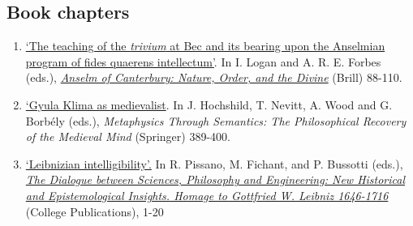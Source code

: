 \subsection{Book chapters}
\begin{enumerate}
	\setcounter{enumi}{\value{publicationCounter}}	%
	\item {}
{}
{
	\href{https://www.academia.edu/15012500/The_trivium_at_Bec_and_its_bearing_on_Anselms_programme_of_fides_quaerens_intellectum}{`The teaching of the \emph{trivium} at Bec and its bearing upon the Anselmian program of {fides quaerens intellectum}'}. In I. Logan and A. R. E. Forbes (eds.), \href{https://doi.org/10.1163/9789004716308_006}{\emph{Anselm of Canterbury: Nature, Order, and the Divine}} (Brill) 88-110.}
{}


\item \datedsubsectionnarrow{}
{}
{
	\href{https://link.springer.com/content/pdf/bbm:978-3-031-15026-5/1}{`Gyula Klima as medievalist}. In J. Hochshild, T. Nevitt, A. Wood and G. Borb\'{e}ly (eds.), \emph{Metaphysics Through Semantics: The Philosophical Recovery of the Medieval Mind} (Springer) 389-400.}
{}
\item {}
{}
{
	\href{https://www.academia.edu/14265939/Leibnizian_intelligibility}{`Leibnizian intelligibility'.} In R. Pissano, M. Fichant, and P. Bussotti (eds.), \href{http://collegepublications.co.uk/dialogues/?00005}{\emph{The Dialogue between Sciences, Philosophy and Engineering: New Historical and Epistemological Insights. Homage to Gottfried W. Leibniz 1646-1716}} (College Publications), 1-20}
{}
	\setcounter{publicationCounter}{\value{enumi}}	%
\end{enumerate}
